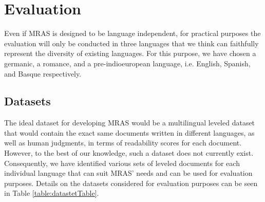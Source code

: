 \documentclass[12pt]{article}
\begin{document}
\section{Evaluation}

Even if MRAS is designed to be language independent, for practical purposes the evaluation will only be conducted in three languages that we think can faithfully represent the diversity of existing languages. For this purpose, we have chosen a germanic, a romance, and a pre-indioeuropean language, i.e. English, Spanish, and Basque respectively.


\subsection{Datasets}
The ideal dataset for developing MRAS would be a multilingual leveled dataset that would contain the exact same documents written in different languages, as well as human judgments, in terms of readability scores for each document. However, to the best of our knowledge, such a dataset does not currently exist. Consequently, we have identified various sets of leveled documents for each individual language that can suit MRAS' needs and can be used for evaluation purposes. Details on the datasets considered for evaluation purposes can be seen in Table \ref{table:datastetTable}.
\end{document}
